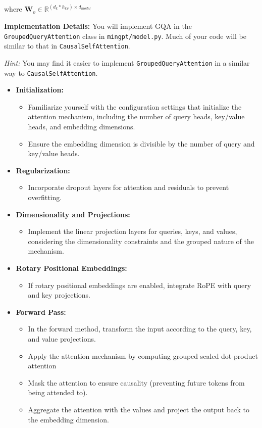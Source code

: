 \documentclass[11pt,addpoints,answers]{exam}
\newcommand{\Rb}{\mathbb{R}}
\newcommand{\Wv}{\mathbf{W}}
\begin{document}
\begin{questions}
\begin{parts}
    where $\Wv_o \in \Rb^{(d_k*h_{kv}) \times d_{model}}$

    \textbf{Implementation Details:}
    You will implement GQA in the \lstinline{GroupedQueryAttention} class in \lstinline{mingpt/model.py}. Much of your code will be similar to that in \lstinline{CausalSelfAttention}. 

    \emph{Hint:} You may find it easier to implement \lstinline{GroupedQueryAttention} in a similar way to \lstinline{CausalSelfAttention}.


    \begin{itemize}
        
    \item \textbf{ Initialization:}
    \begin{itemize}
        \item Familiarize yourself with the configuration settings that initialize the attention mechanism, including the number of query heads, key/value heads, and embedding dimensions.
        \item Ensure the embedding dimension is divisible by the number of query and key/value heads.
    \end{itemize}
    
    \item \textbf{Regularization:}
    \begin{itemize}
        \item Incorporate dropout layers for attention and residuals to prevent overfitting.
    \end{itemize}
    
    \item \textbf{Dimensionality and Projections:}
    \begin{itemize}
        \item Implement the linear projection layers for queries, keys, and values, considering the dimensionality constraints and the grouped nature of the mechanism.
    \end{itemize}

    \item \textbf{Rotary Positional Embeddings:}
    \begin{itemize}
        \item If rotary positional embeddings are enabled, integrate RoPE with query and key projections. 
    \end{itemize}
    
    \item \textbf{Forward Pass:}
    \begin{itemize}
        \item In the forward method, transform the input according to the query, key, and value projections.
        \item Apply the attention mechanism by computing grouped scaled dot-product attention
        \item Mask the attention to ensure causality (preventing future tokens from being attended to).
        \item Aggregate the attention with the values and project the output back to the embedding dimension.
    \end{itemize}
    

\end{itemize}
\end{parts}
\end{questions}
\end{document}
